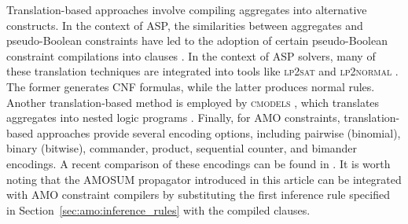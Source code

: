 Translation-based approaches involve compiling aggregates into alternative constructs. 
In the context of ASP, the similarities between aggregates and pseudo-Boolean constraints have 
led to the adoption of certain pseudo-Boolean constraint compilations into clauses \cite{DBLP:conf/sara/AavaniMT13}. 
In the context of ASP solvers, many of these translation techniques are integrated into tools like \textsc{lp2sat} and 
\textsc{lp2normal} \cite{DBLP:conf/jelia/BomansonGJ14,DBLP:conf/lpnmr/BomansonJ13}. The former generates CNF formulas, 
while the latter produces normal rules. Another translation-based method is employed by 
\textsc{cmodels} \cite{DBLP:conf/lpnmr/LierlerM04,DBLP:journals/jar/GiunchigliaLM06,DBLP:journals/amai/GiunchigliaLM08}, 
which translates aggregates into nested logic programs \cite{DBLP:journals/tplp/FerrarisL05}.
Finally, for AMO constraints, translation-based approaches provide several encoding options, 
including pairwise (binomial), binary (bitwise), commander, product, sequential counter, 
and bimander encodings. A recent comparison of these encodings can be found in \cite{DBLP:conf/sma2/NguyenNKB20}. 
It is worth noting that the AMOSUM propagator introduced in this article can be integrated with AMO constraint 
compilers by substituting the first inference rule specified in Section~\ref{sec:amo:inference_rules} with the compiled clauses.
